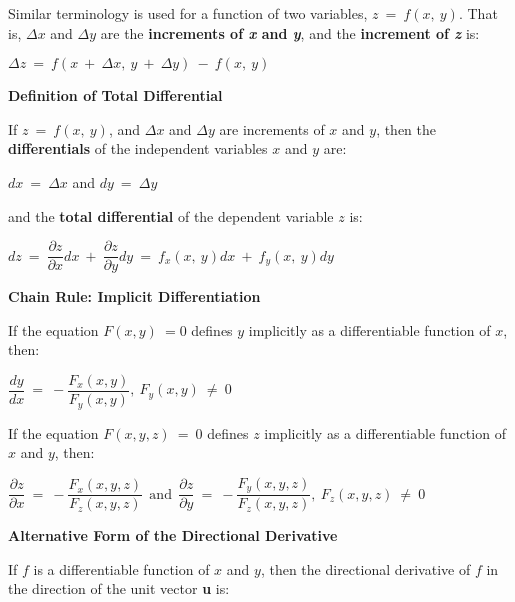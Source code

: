 \documentclass{article}
\begin{document}
\begin{large}
\hspace{0.1in} Similar terminology is used for a function of two variables, $z\ =\ f(x,\ y)$.  That is, $\Delta x$ and $\Delta y$ are the \textbf{increments of \textit{x} and \textit{y}}, and the \textbf{increment of \textit{z}} is:

\hspace{1.5in} $\Delta z\ =\ f(x\ +\ \Delta x,\ y\ +\ \Delta y)\ -\ f(x,\ y)$

\textbf{Definition of Total Differential}

\hspace{0.1in} If $z\ =\ f(x,\ y)$, and $\Delta x$ and $\Delta y$ are increments of $x$ and $y$, then the \textbf{differentials} of the independent variables $x$ and $y$ are:

\hspace{2.5in} $dx\ =\ \Delta x$ and $dy\ =\ \Delta y$

\hspace{0.1in} and the \textbf{total differential} of the dependent variable $z$ is:

\hspace{1.0in} $dz\ =\ \dfrac{\partial z}{\partial x}dx\ +\ \dfrac{\partial z}{\partial y}dy\ =\ f_{x}(x,\ y)dx\ +\ f_{y}(x,\ y)dy$

\vspace{1.0in}
\textbf{Chain Rule: Implicit Differentiation}

\hspace{0.1in} If the equation $F(x,y)\ = 0$ defines $y$ implicitly as a differentiable function of $x$, then:

\vspace{-0.3in}
\hspace{2.0in} $\dfrac{dy}{dx}\ =\ -\dfrac{F_{x}(x,y)}{F_{y}(x,y)},\ F_{y}(x,y)\ \ne\ 0$

\hspace{0.1in} If the equation $F(x,y,z)\ =\ 0$ defines $z$ implicitly as a differentiable function of $x$ and $y$, then:

\hspace{1.0in} $\dfrac{\partial z}{\partial x}\ =\ -\dfrac{F_{x}(x,y,z)}{F_{z}(x,y,z)}\ \ \text{and}\ \ \dfrac{\partial z}{\partial y}\ =\ -\dfrac{F_{y}(x,y,z)}{F_{z}(x,y,z)},\ F_{z}(x,y,z)\ \ne\ 0$

\textbf{Alternative Form of the Directional Derivative}

\vspace{-0.2in}
\hspace{0.1in} If $f$ is a differentiable function of $x$ and $y$, then the directional derivative of $f$ in the direction of the unit vector \textbf{u} is:


\end{large}
\end{document}
